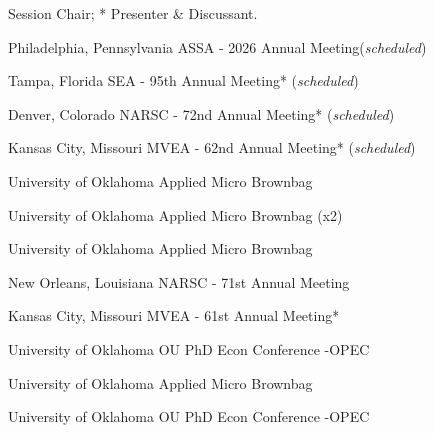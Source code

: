 \textdagger Session Chair; * Presenter \& Discussant.

{%
	Philadelphia, Pennsylvania}
{%
	ASSA - 2026 Annual Meeting\ec (\textit{scheduled})}
{}


{%
	Tampa, Florida}
{%
	SEA - 95th Annual Meeting* (\textit{scheduled})}
{}


{%
	Denver, Colorado}
{%
	NARSC - 72nd Annual Meeting* (\textit{scheduled})}
{}

{%
	Kansas City, Missouri}
{%
	MVEA - 62nd Annual Meeting* (\textit{scheduled})}
{}

{%
	University of Oklahoma}
{%
	Applied Micro Brownbag }
{}

{%
	University of Oklahoma}
{%
	Applied Micro Brownbag (x2)}
{}

{%
	University of Oklahoma}
{%
	Applied Micro Brownbag}
{}

{%
	New Orleans, Louisiana}
{%
	NARSC - 71st Annual Meeting\ec}
{}

{%
	Kansas City, Missouri}
{%
	MVEA - 61st Annual Meeting*}
{}


{%
	University of Oklahoma}
{%
	OU PhD Econ Conference -OPEC}
{}

{%
	University of Oklahoma}
{%
	Applied Micro Brownbag}
{}

{%
	University of Oklahoma}
{%
	OU PhD Econ Conference -OPEC}
{}